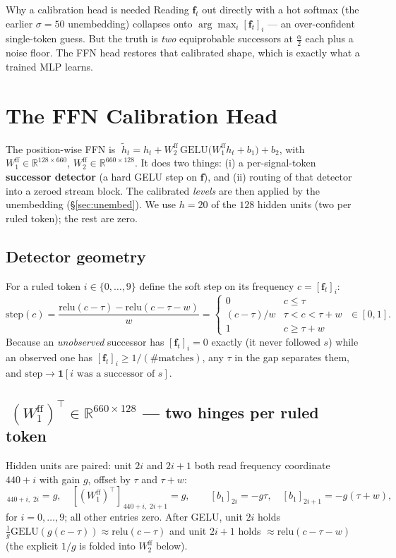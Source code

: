 \documentclass[11pt]{article}
\newcommand{\R}{\mathbb{R}}
\newcommand{\T}{^{\!\top}}
\newcommand{\fvec}{\mathbf{f}}
\newcommand{\one}{\mathbf{1}}
\begin{document}
\begin{takebox}{Why a calibration head is needed}
Reading $\fvec_t$ out directly with a hot softmax (the earlier $\sigma=50$ unembedding) collapses
onto $\arg\max_i[\fvec_t]_i$ --- an over-confident single-token guess. But the truth is
\emph{two} equiprobable successors at $\tfrac{\alpha}{2}$ each plus a noise floor. The FFN head
restores that calibrated shape, which is exactly what a trained MLP learns.
\end{takebox}

\section{The FFN Calibration Head}
\label{sec:ffn}
The position-wise FFN is $\;\tilde h_t = h_t + W_2^{\mathrm{ff}}\,\mathrm{GELU}\!\big(W_1^{\mathrm{ff}}h_t+b_1\big)+b_2$,
with $W_1^{\mathrm{ff}}\in\R^{128\times660}$, $W_2^{\mathrm{ff}}\in\R^{660\times128}$. It does two
things: (i) a per-signal-token \textbf{successor detector} (a hard GELU step on $\fvec$), and
(ii) routing of that detector into a zeroed stream block. The calibrated \emph{levels} are then
applied by the unembedding (\S\ref{sec:unembed}). We use $h=20$ of the $128$ hidden units
(two per ruled token); the rest are zero.

\subsection{Detector geometry}
For a ruled token $i\in\{0,\dots,9\}$ define the soft step on its frequency $c=[\fvec_t]_i$:
\begin{equation}
\mathrm{step}(c)=\frac{\mathrm{relu}(c-\tau)-\mathrm{relu}(c-\tau-w)}{w}=
\begin{cases}0 & c\le\tau\\ (c-\tau)/w & \tau<c<\tau+w\\ 1 & c\ge\tau+w\end{cases}
\;\in[0,1].
\end{equation}
Because an \emph{unobserved} successor has $[\fvec_t]_i=0$ exactly (it never followed $s$) while an
observed one has $[\fvec_t]_i\ge 1/(\text{\#matches})$, any $\tau$ in the gap separates them, and
$\mathrm{step}\to\one[i\text{ was a successor of }s]$.

\subsection{$\;(W_1^{\mathrm{ff}})\T\in\R^{660\times128}$ --- two hinges per ruled token}
Hidden units are paired: unit $2i$ and $2i{+}1$ both read frequency coordinate $440{+}i$ with gain
$g$, offset by $\tau$ and $\tau{+}w$:
\begin{equation}
[(W_1^{\mathrm{ff}})\T]_{\,440+i,\;2i}=g,\quad
[(W_1^{\mathrm{ff}})\T]_{\,440+i,\;2i+1}=g,\qquad
[b_1]_{2i}=-g\tau,\quad [b_1]_{2i+1}=-g(\tau+w),
\end{equation}
for $i=0,\dots,9$; all other entries zero. After GELU, unit $2i$ holds
$\tfrac1g\mathrm{GELU}(g(c-\tau))\!\approx\!\mathrm{relu}(c-\tau)$ and unit $2i{+}1$ holds
$\approx\mathrm{relu}(c-\tau-w)$ (the explicit $1/g$ is folded into $W_2^{\mathrm{ff}}$ below).
\end{document}
